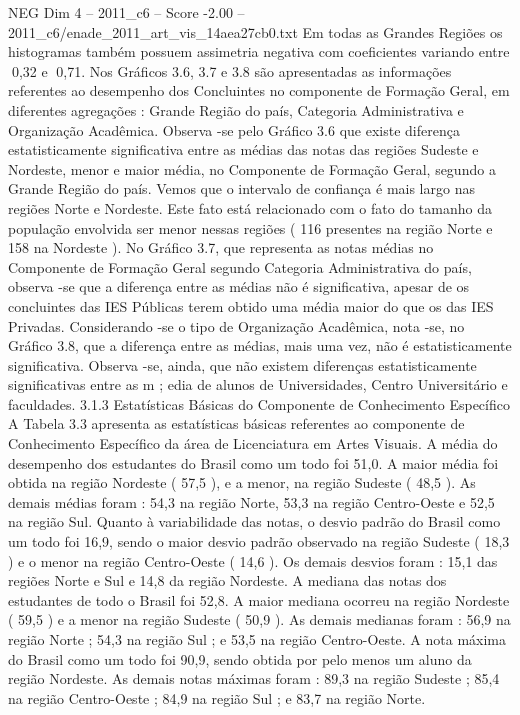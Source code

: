 \begin{textsample}{NEG Dim 4 – 2011\_c6 – Score -2.00 – 2011\_c6/enade\_2011\_art\_vis\_14aea27cb0.txt}
Em todas as Grandes Regiões os histogramas também possuem assimetria negativa com coeficientes variando entre 0,32 e 0,71.
Nos Gráficos 3.6, 3.7 e 3.8 são apresentadas as informações referentes ao desempenho dos Concluintes no componente de Formação Geral, em diferentes agregações : Grande Região do país, Categoria Administrativa e Organização Acadêmica.
Observa -se pelo Gráfico 3.6 que existe diferença estatisticamente significativa entre as médias das notas das regiões Sudeste e Nordeste, menor e maior média, no Componente de Formação Geral, segundo a Grande Região do país.
Vemos que o intervalo de confiança é mais largo nas regiões Norte e Nordeste.
Este fato está relacionado com o fato do tamanho da população envolvida ser menor nessas regiões ( 116 presentes na região Norte e 158 na Nordeste ).
No Gráfico 3.7, que representa as notas médias no Componente de Formação Geral segundo Categoria Administrativa do país, observa -se que a diferença entre as médias não é significativa, apesar de os concluintes das IES Públicas terem obtido uma média maior do que os das IES Privadas.
Considerando -se o tipo de Organização Acadêmica, nota -se, no Gráfico 3.8, que a diferença entre as médias, mais uma vez, não é estatisticamente significativa.
Observa -se, ainda, que não existem diferenças estatisticamente significativas entre as m ; edia de alunos de Universidades, Centro Universitário e faculdades. 3.1.3 Estatísticas Básicas do Componente de Conhecimento Específico A Tabela 3.3 apresenta as estatísticas básicas referentes ao componente de Conhecimento Específico da área de Licenciatura em Artes Visuais.
A média do desempenho dos estudantes do Brasil como um todo foi 51,0.
A maior média foi obtida na região Nordeste ( 57,5 ), e a menor, na região Sudeste ( 48,5 ).
As demais médias foram : 54,3 na região Norte, 53,3 na região Centro-Oeste e 52,5 na região Sul.
Quanto à variabilidade das notas, o desvio padrão do Brasil como um todo foi 16,9, sendo o maior desvio padrão observado na região Sudeste ( 18,3 ) e o menor na região Centro-Oeste ( 14,6 ).
Os demais desvios foram : 15,1 das regiões Norte e Sul e 14,8 da região Nordeste.
A mediana das notas dos estudantes de todo o Brasil foi 52,8.
A maior mediana ocorreu na região Nordeste ( 59,5 ) e a menor na região Sudeste ( 50,9 ).
As demais medianas foram : 56,9 na região Norte ; 54,3 na região Sul ; e 53,5 na região Centro-Oeste.
A nota máxima do Brasil como um todo foi 90,9, sendo obtida por pelo menos um aluno da região Nordeste.
As demais notas máximas foram : 89,3 na região Sudeste ; 85,4 na região Centro-Oeste ; 84,9 na região Sul ; e 83,7 na região Norte.

\end{textsample}
